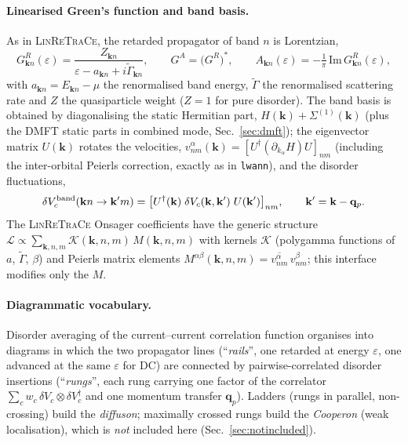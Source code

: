 \documentclass[11pt]{article}
\newcommand{\vk}{\mathbf{k}}
\newcommand{\vq}{\mathbf{q}}
\newcommand{\eps}{\varepsilon}
\newcommand{\Gam}{\Gamma}
\begin{document}
\paragraph{Linearised Green's function and band basis.}
As in \textsc{LinReTraCe}, the retarded propagator of band $n$ is
Lorentzian,
\begin{equation}
G^{R}_{\vk n}(\eps)=\frac{Z_{\vk n}}
{\eps-a_{\vk n}+i\tilde\Gam_{\vk n}},\qquad
G^{A}=\big(G^{R}\big)^{*},\qquad
A_{\vk n}(\eps)=-\tfrac1\pi\,\mathrm{Im}\,G^R_{\vk n}(\eps),
\label{eq:G}
\end{equation}
with $a_{\vk n}=E_{\vk n}-\mu$ the renormalised band energy,
$\tilde\Gam$ the renormalised scattering rate and $Z$ the quasiparticle
weight ($Z{=}1$ for pure disorder).  The band basis is obtained by
diagonalising the static Hermitian part,
$H(\vk)+\Sigma^{(1)}(\vk)$ (plus the DMFT static parts in combined mode,
Sec.~\ref{sec:dmft}); the eigenvector matrix $U(\vk)$ rotates the
velocities, $v_{nm}^{\alpha}(\vk)=[U^\dagger(\partial_{k_\alpha}
H)U]_{nm}$ (including the inter-orbital Peierls correction, exactly as
in \texttt{lwann}), and the disorder fluctuations,
\begin{equation}
\delta V^{\rm band}_{c}(\vk n\to\vk'm)
=\big[U^\dagger(\vk)\;\delta V_c(\vk,\vk')\;U(\vk')\big]_{nm},
\qquad \vk'=\vk-\vq_p .
\label{eq:dVband}
\end{equation}
The \textsc{LinReTraCe} Onsager coefficients have the generic structure
$\mathcal L\propto\sum_{\vk,n,m}\mathcal K(\vk,n,m)\,M(\vk,n,m)$ with
kernels $\mathcal K$ (polygamma functions of $a$, $\tilde\Gam$, $\beta$)
and Peierls matrix elements
$M^{\alpha\beta}(\vk,n,m)=\overline{v^{\alpha}_{nm}}\,v^{\beta}_{nm}$;
this interface modifies only the $M$.

\paragraph{Diagrammatic vocabulary.}
Disorder averaging of the current--current correlation function
organises into diagrams in which the two propagator lines
(``\emph{rails}'', one retarded at energy $\eps$, one advanced at the
same $\eps$ for DC) are connected by pairwise-correlated disorder
insertions (``\emph{rungs}'', each rung carrying one factor of the
correlator $\sum_c w_c\,\delta V_c\otimes\delta V_c^\dagger$ and one
momentum transfer $\vq_p$).  Ladders (rungs in parallel, non-crossing)
build the \emph{diffuson}; maximally crossed rungs build the
\emph{Cooperon} (weak localisation), which is \emph{not} included here
(Sec.~\ref{sec:notincluded}).
\end{document}
